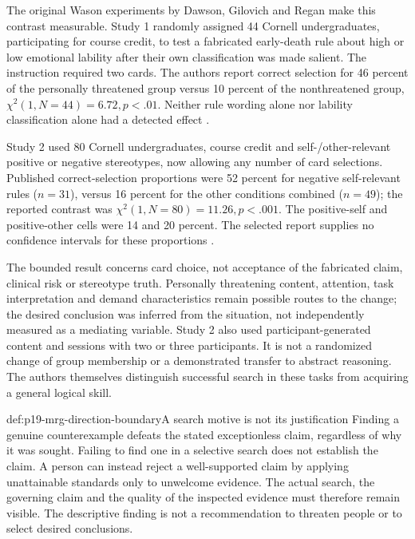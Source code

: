 The original Wason experiments by Dawson, Gilovich and Regan make this
contrast measurable. Study 1 randomly assigned 44 Cornell undergraduates,
participating for course credit, to test a fabricated early-death rule about
high or low emotional lability after their own classification was made
salient. The instruction required two cards. The authors report correct
selection for 46 percent of the personally threatened group versus
10 percent of the nonthreatened group,
\(\chi^2(1,N=44)=6.72,p<.01\).
Neither rule wording alone nor lability classification alone had a detected
effect \cite[pp.~1381--1383, fig.~1]{DawsonGilovichRegan2002WasonMRG}.

Study 2 used 80 Cornell undergraduates, course credit and self-/other-relevant
positive or negative stereotypes, now allowing any number of card selections.
Published correct-selection proportions were 52 percent for negative
self-relevant rules (\(n=31\)), versus 16 percent for the other conditions
combined (\(n=49\)); the reported contrast was
\(\chi^2(1,N=80)=11.26,p<.001\).
The positive-self and positive-other cells were 14 and 20 percent.
The selected report supplies no confidence intervals for these proportions
\cite[pp.~1383--1385, fig.~2]{DawsonGilovichRegan2002WasonMRG}.

The bounded result concerns card choice, not acceptance of the fabricated
claim, clinical risk or stereotype truth. Personally threatening content,
attention, task interpretation and demand characteristics remain possible
routes to the change; the desired conclusion was inferred from the situation,
not independently measured as a mediating variable. Study 2 also used
participant-generated content and sessions with two or three participants.
It is not a randomized change of group membership or a demonstrated transfer
to abstract reasoning. The authors themselves distinguish successful search
in these tasks from acquiring a general logical skill.

\begin{hbwarning}{def:p19-mrg-direction-boundary}{A search motive is not its justification}
Finding a genuine counterexample defeats the stated exceptionless claim,
regardless of why it was sought. Failing to find one in a selective search
does not establish the claim. A person can instead reject a well-supported
claim by applying unattainable standards only to unwelcome evidence.
The actual search, the governing claim and the quality of the inspected
evidence must therefore remain visible. The descriptive finding is not a
recommendation to threaten people or to select desired conclusions.
\end{hbwarning}

